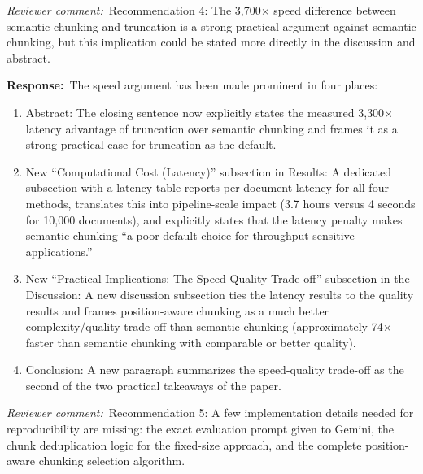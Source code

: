 \documentclass[11pt]{article}
\newcommand{\rcomment}[1]{\noindent\textcolor{revcomment}{\textit{Reviewer comment:}}~#1\par\medskip}
\newcommand{\rresponse}[1]{\noindent\textcolor{response}{\textbf{Response:}}~#1\par\medskip\medskip}
\begin{document}
\rcomment{Recommendation 4: The 3{,}700$\times$ speed difference between semantic chunking and truncation is a strong practical argument against semantic chunking, but this implication could be stated more directly in the discussion and abstract.}

\rresponse{The speed argument has been made prominent in four places:
\begin{enumerate}
    \item Abstract: The closing sentence now explicitly states the measured 3{,}300$\times$ latency advantage of truncation over semantic chunking and frames it as a strong practical case for truncation as the default.
    \item New ``Computational Cost (Latency)'' subsection in Results: A dedicated subsection with a latency table reports per-document latency for all four methods, translates this into pipeline-scale impact (3.7 hours versus 4 seconds for 10{,}000 documents), and explicitly states that the latency penalty makes semantic chunking ``a poor default choice for throughput-sensitive applications.''
    \item New ``Practical Implications: The Speed-Quality Trade-off'' subsection in the Discussion: A new discussion subsection ties the latency results to the quality results and frames position-aware chunking as a much better complexity/quality trade-off than semantic chunking (approximately 74$\times$ faster than semantic chunking with comparable or better quality).
    \item Conclusion: A new paragraph summarizes the speed-quality trade-off as the second of the two practical takeaways of the paper.
\end{enumerate}}

\rcomment{Recommendation 5: A few implementation details needed for reproducibility are missing: the exact evaluation prompt given to Gemini, the chunk deduplication logic for the fixed-size approach, and the complete position-aware chunking selection algorithm.}
\end{document}
